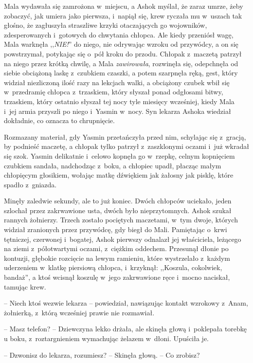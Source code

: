 \documentclass[oneside,polish,11pt,rmheadings]{mwbk}
\begin{document}
Mala wydawała się zamrożona w~miejscu, a Ashok myślał, że zaraz umrze, żeby zobaczyć, jak umiera jako pierwsza, i~napiął się, krew ryczała mu w~uszach tak głośno, że zagłuszyła straszliwe krzyki otaczających go wojowników, zdesperowanych i~gotowych do chwytania chłopca. Ale kiedy przeniósł wagę, Mala warknęła ,,\textit{NIE!}'' do niego, nie odrywając wzroku od przywódcy, a on się powstrzymał, potykając się o~pół kroku do przodu. Chłopak z~maczetą patrzył na niego przez krótką chwilę, a Mala \textit{zawirowała}, rozwinęła się, odepchnęła od siebie obciążoną laskę z~czubkiem czaszki, a potem szarpnęła ręką, gest, który widział niezliczoną ilość razy na lekcjach walki, a obciążony czubek wbił się w~przedramię chłopca z~trzaskiem, który słyszał ponad odgłosami bitwy, trzaskiem, który ostatnio słyszał tej nocy tyle miesięcy wcześniej, kiedy Mala i~jej armia przyszli po niego i~Yasmin w~nocy. Syn lekarza Ashoka wiedział dokładnie, co oznacza to chrupnięcie.

Rozmazany materiał, gdy Yasmin przetańczyła przed nim, schylając się z~gracją, by podnieść maczetę, a chłopak tylko patrzył z~zaszklonymi oczami i~już wkradał się szok. Yasmin delikatnie i~celowo kopnęła go w~rzepkę, celnym kopnięciem czubkiem sandała, nadchodząc z~boku, a chłopiec upadł, płacząc małym chłopięcym głosikiem, wołając matkę dźwiękiem jak żałosny jak pisklę, które spadło z~gniazda.

Minęły zaledwie sekundy, ale to już koniec. Dwóch chłopców uciekało, jeden szlochał przez zakrwawione usta, dwóch było nieprzytomnych. Ashok szukał rannych żołnierzy. Trzech zostało pociętych maczetami, w~tym dwoje, których widział zranionych przez przywódcę, gdy biegł do Mali. Pamiętając o~krwi tętniczej, czerwonej i~bogatej, Ashok pierwszy odnalazł jej właściciela, leżącego na ziemi z~półotwartymi oczami, z~ciężkim oddechem. Przesunął dłonie po kontuzji, głębokie rozcięcie na lewym ramieniu, które wystrzelało z~każdym uderzeniem w~klatkę piersiową chłopca, i~krzyknął: ,,Koszula, cokolwiek, bandaż'', a ktoś wcisnął koszulę w~jego zakrwawione ręce i~mocno naciskał, tamując krew. 

-- Niech ktoś wezwie lekarza -- powiedział, nawiązując kontakt wzrokowy z~Anam, żołnierką, z~którą wcześniej prawie nie rozmawiał. 

-- Masz telefon? -- Dziewczyna lekko drżała, ale skinęła głową i~poklepała torebkę u boku, z~roztargnieniem wymachując żelazem w~dłoni. Upuściła je. 

-- Dzwonisz do lekarza, rozumiesz? -- Skinęła głową. -- Co zrobisz? 
\end{document}
